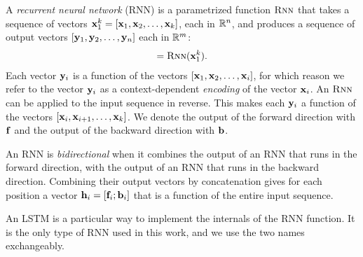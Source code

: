   \begin{definition}{} A \textit{recurrent neural network} (RNN) is a parametrized function $\textsc{Rnn}$ that takes a sequence of vectors $\mathbf{x}_1^k = [ \mathbf{x}_1, \mathbf{x}_2, \dots, \mathbf{x}_k ]$, each in $\mathbb{R}^{n}$, and produces a sequence of output vectors $[\mathbf{y}_1, \mathbf{y}_2, \dots,\mathbf{y}_n]$ each in $\mathbb{R}^{m}$:
  \begin{align*}
    [\vecy_1, \vecy_2, \dots, \vecy_k] = \rnn( \mathbf{x}_1^k ).
  \end{align*}
  Each vector $\mathbf{y}_i$ is a function of the vectors $[\mathbf{x}_1, \mathbf{x}_2, \dots, \mathbf{x}_i ]$, for which reason we refer to the vector $\mathbf{y}_i$ as a context-dependent \textit{encoding} of the vector $\mathbf{x}_i$. An $\textsc{Rnn}$ can be applied to the input sequence in reverse. This makes each $\mathbf{y}_i$ a function of the vectors $[\mathbf{x}_i, \mathbf{x}_{i+1}, \dots, \mathbf{x}_k ]$. We denote the output of the forward direction with $\mathbf{f}$ and the output of the backward direction with $\mathbf{b}$.
  \end{definition}

  \begin{definition}{} An RNN is \textit{bidirectional} when it combines the output of an RNN that runs in the forward direction, with the output of an RNN that  runs in the backward direction. Combining their output vectors by concatenation gives for each position a vector $\mathbf{h}_i = [ \mathbf{f}_i; \mathbf{b}_i ]$ that is a function of the entire input sequence.
  \end{definition}

  \begin{definition}{} An LSTM \citep{hochreiter1997long} is a particular way to implement the internals of the RNN function. It is the only type of RNN used in this work, and we use the two names exchangeably.
  \end{definition}
